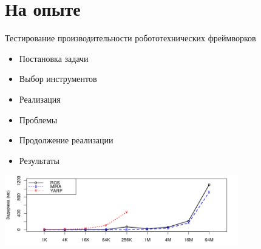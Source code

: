 \section{На опыте}

\begin{frame}{Тестирование производительности робототехнических фреймворков}
	\begin{itemize}
		\item Постановка задачи
		\item Выбор инструментов
		\item Реализация
		\item Проблемы
		\item Продолжение реализации
		\item Результаты
	\end{itemize}
	\centering
	\includegraphics[height=3cm]{img/robots.png}
\end{frame}


